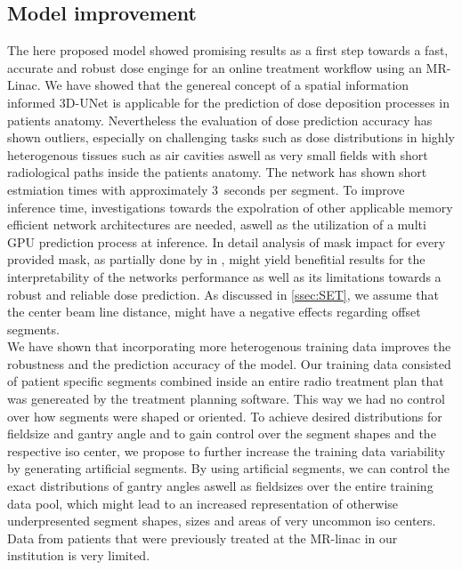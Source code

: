 \subsection{Model improvement}

The here proposed model showed promising results as a first step towards a fast, accurate and robust dose enginge for an online treatment workflow using an MR-Linac. 
We have showed that the genereal concept of a spatial information informed 3D-UNet is applicable for the prediction of dose deposition processes in patients anatomy.
Nevertheless the evaluation of dose prediction accuracy has shown outliers, especially on challenging tasks such as dose distributions in highly heterogenous tissues such as air cavities aswell as very small fields with short radiological paths inside the patients anatomy.  
The network has shown short estmiation times with approximately 3~seconds per segment. 
To improve inference time, investigations towards the expolration of other applicable memory efficient network architectures are needed, aswell as the utilization of a multi GPU prediction process at inference.
In detail analysis of mask impact for every provided mask, as partially done by \citeauthor{kontaxis_deepdose_2020} in \cite{kontaxis_deepdose_2020}, might yield benefitial results for the interpretability of the networks performance as well as its limitations towards a robust and reliable dose prediction. 
As discussed in \autoref{ssec:SET}, we assume that the center beam line distance, might have a negative effects regarding offset segments. \\
We have shown that incorporating more heterogenous training data improves the robustness and the prediction accuracy of the model.
Our training data consisted of patient specific segments combined inside an entire radio treatment plan that was genereated by the treatment planning software. 
This way we had no control over how segments were shaped or oriented.
To achieve desired distributions for fieldsize and gantry angle and to gain control over the segment shapes and the respective iso center, we propose to further increase the training data variability by generating artificial segments.
By using artificial segments, we can control the exact distributions of gantry angles aswell as fieldsizes over the entire training data pool, which might lead to an increased representation of otherwise underpresented segment shapes, sizes and areas of very uncommon iso centers.\\
Data from patients that were previously treated at the MR-linac in our institution is very limited.
